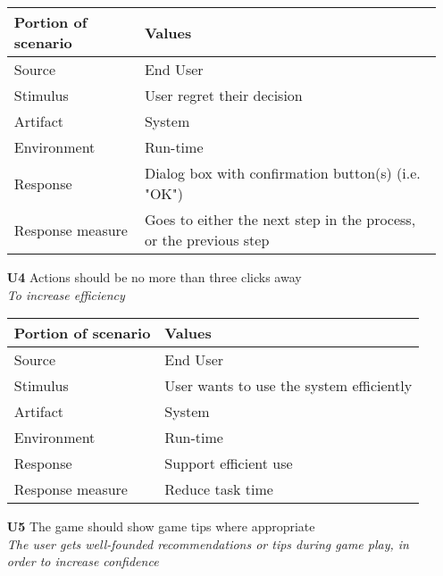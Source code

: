 \begin{itemize}
        \begin{tabular}{| l | l |}
            \hline
            \rowcolor[gray]{0.8}
            \textbf{Portion of scenario} & \textbf{Values} \\
            \hline
            Source & End User \\
            Stimulus & User regret their decision \\
            Artifact & System \\
            Environment & Run-time \\
            Response & Dialog box with confirmation button(s) (i.e. "OK") \\
            Response measure & Goes to either the next step in the process, or the previous step \\
            \hline
        \end{tabular}
        
        \newpage
        
        \item[\textbf{U4}] Actions should be no more than three clicks away \\
        \textit{\small{To increase efficiency}}
        
        \begin{tabular}{| l | l |}
            \hline
            \rowcolor[gray]{0.8}
            \textbf{Portion of scenario} & \textbf{Values} \\
            \hline
            Source & End User \\
            Stimulus & User wants to use the system efficiently \\
            Artifact & System \\
            Environment & Run-time \\
            Response & Support efficient use \\
            Response measure & Reduce task time \\
            \hline
        \end{tabular}
        
        \item[\textbf{U5}] The game should show game tips where appropriate \\
        \textit{\small{The user gets well-founded recommendations or tips during game play, in order to increase confidence}}
        

\end{itemize}
